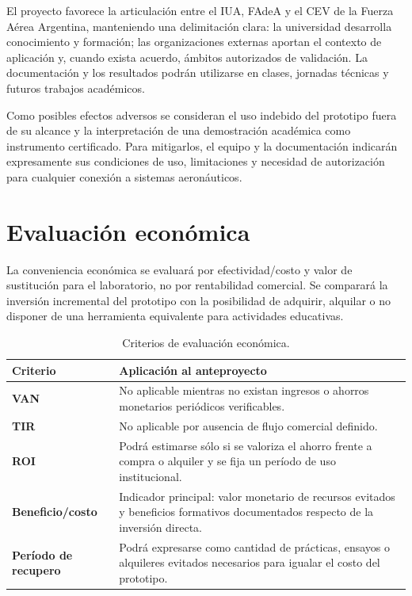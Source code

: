 \documentclass[12pt,a4paper,oneside]{article}
\begin{document}
El proyecto favorece la articulación entre el IUA, FAdeA y el CEV de la Fuerza Aérea Argentina, manteniendo una delimitación clara: la universidad desarrolla conocimiento y formación; las organizaciones externas aportan el contexto de aplicación y, cuando exista acuerdo, ámbitos autorizados de validación. La documentación y los resultados podrán utilizarse en clases, jornadas técnicas y futuros trabajos académicos.

Como posibles efectos adversos se consideran el uso indebido del prototipo fuera de su alcance y la interpretación de una demostración académica como instrumento certificado. Para mitigarlos, el equipo y la documentación indicarán expresamente sus condiciones de uso, limitaciones y necesidad de autorización para cualquier conexión a sistemas aeronáuticos.

\section{Evaluación económica}

La conveniencia económica se evaluará por efectividad/costo y valor de sustitución para el laboratorio, no por rentabilidad comercial. Se comparará la inversión incremental del prototipo con la posibilidad de adquirir, alquilar o no disponer de una herramienta equivalente para actividades educativas.

\begin{table}[H]
  \centering
  \small
  \begin{tabularx}{\textwidth}{>{\bfseries}p{3.2cm}X}
    \toprule
    Criterio & Aplicación al anteproyecto \\
    \midrule
    VAN & No aplicable mientras no existan ingresos o ahorros monetarios periódicos verificables. \\
    TIR & No aplicable por ausencia de flujo comercial definido. \\
    ROI & Podrá estimarse sólo si se valoriza el ahorro frente a compra o alquiler y se fija un período de uso institucional. \\
    Beneficio/costo & Indicador principal: valor monetario de recursos evitados y beneficios formativos documentados respecto de la inversión directa. \\
    Período de recupero & Podrá expresarse como cantidad de prácticas, ensayos o alquileres evitados necesarios para igualar el costo del prototipo. \\
    \bottomrule
  \end{tabularx}
  \caption{Criterios de evaluación económica.}
  \label{tab:evaluacion-economica}
\end{table}
\end{document}
